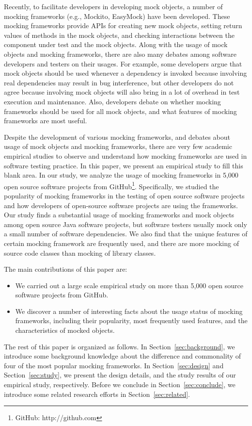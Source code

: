 Recently, to facilitate developers in developing mock objects, a number of mocking frameworks (e.g., Mockito, EasyMock) have been developed. These mocking frameworks provide APIs for creating new mock objects, setting return values of methods in the mock objects, and checking interactions between the component under test and the mock objects. Along with the usage of mock objects and mocking frameworks, there are also  many debates among software developers and testers on their usages. For example, some developers argue that mock objects should be used whenever a dependency is invoked because involving real dependencies may result in bug interference, but other developers do not agree because involving mock objects will also bring in a lot of overhead in test execution and maintenance. Also, developers debate on whether mocking frameworks should be used for all mock objects, and what features of mocking frameworks are most useful. 

Despite the development of various mocking frameworks, and debates about usage of mock objects and mocking frameworks, there are very few academic empirical studies to observe and understand how mocking frameworks are used in software testing practice. In this paper, we present an empirical study to fill this blank area. In our study, we analyze the usage of mocking frameworks in 5,000 open source software projects from GitHub\footnote{GitHub: http://github.com}. Specifically, we studied the popularity of mocking frameworks in the testing of open source software projects and how developers of open-source software projects are using the frameworks. Our study finds a substantial usage of mocking frameworks and mock objects among open source Java software projects, but software testers usually mock only a small number of software dependencies. We also find that the unique features of certain mocking framework are frequently used, and there are more mocking of source code classes than mocking of library classes. 
 
The main contributions of this paper are: 
\begin{itemize}
\item We carried out a large scale empirical study on more than 5,000 open source software projects from GitHub. 
\item We discover a number of interesting facts about the usage status of mocking frameworks, including their popularity, most frequently used features, and the characteristics of mocked objects.
\end{itemize}
 
The rest of this paper is organized as follows. In Section~\ref{sec:background}, we introduce some background knowledge about the difference and commonality of four of the most popular mocking frameworks. In Section~\ref{sec:design} and Section~\ref{sec:study}, we present the design details, and the study results of our empirical study, respectively. Before we conclude in Section~\ref{sec:conclude}, we introduce some related research efforts in Section~\ref{sec:related}.
